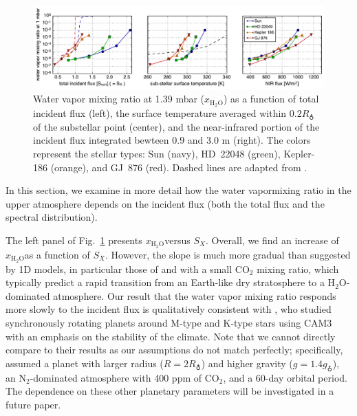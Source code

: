 \documentclass[11pt,numberedappendix,twocolappendix,]{emulateapj}
\def\water{H$_2$O}
\def\xwater{$x_\text{\water}$}
\def\preslevel{1.39 mbar}
\def\wv{water vapor}
\newcommand{\yf}[1]{{\color{orange}#1}}
\begin{document}
\begin{figure}[!tb]
    \begin{center}
    \includegraphics[width=\hsize]{xH2O_3panels.pdf}
    \end{center}
\caption{Water vapor mixing ratio at \preslevel{} (\xwater{}) as a function of total incident flux (left), the surface temperature \yf{averaged within $0.2R_\earth$ of the substellar point} (center), and the near-infrared portion of the incident flux integrated bewteen 0.9 and 3.0 \textmu m (right). The colors represent the stellar types: Sun (navy), HD~22048 (green), Kepler-186 (orange), and GJ~876 (red). Dashed lines are adapted from \citet{Kasting1993}. }                                                                                                             
\label{fig:xH2O_S0X}
\end{figure}

In this section, we examine in more detail how the \wv mixing ratio in the upper atmosphere depends on the incident flux (both the total flux and the spectral distribution). 

The left panel of Fig.~\ref{fig:xH2O_S0X} presents \xwater versus $S_X$. 
Overall, we find an increase of \xwater as a function of $S_X$. 
However, the slope is much more gradual than suggested by 1D models, in particular those  of \citet{Kasting1993} and \citet{Wordsworth2013} with a small CO$_2$ mixing ratio, which typically predict a rapid transition from an Earth-like dry stratosphere to a \water{}-dominated atmosphere. 
Our result that the \wv{} mixing ratio responds more slowly to the incident flux is qualitatively consistent with \citet{Yang2013}, who studied synchronously rotating planets around M-type and K-type stars using CAM3 with an emphasis on the stability of the climate. 
Note that we cannot directly compare to their results as our assumptions do not match perfectly; specifically, \cite{Yang2013} assumed a planet with larger radius ($R=2R_\earth$) and higher gravity ($g=1.4g_\earth$), an N$_2$-dominated atmosphere with 400 ppm of CO$_2$, and a 60-day orbital period. 
The dependence on these other planetary parameters will be investigated in a future paper. 
\end{document}
